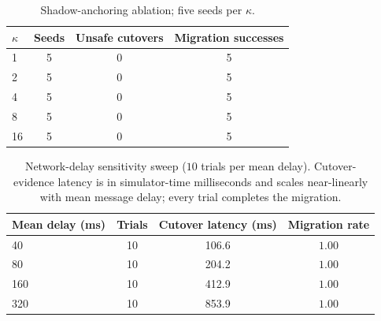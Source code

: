 \documentclass[journal]{IEEEtran}
\begin{document}
\begin{table}[h]
\centering
\caption{Shadow-anchoring ablation; five seeds per $\kappa$.}
\label{tab:appabl}
\setlength{\tabcolsep}{5pt}\renewcommand{\arraystretch}{1.15}\footnotesize
\begin{tabular}{lccc}
\toprule
$\kappa$ & Seeds & Unsafe cutovers & Migration successes \\
\midrule
1  & 5 & 0 & 5 \\
2  & 5 & 0 & 5 \\
4  & 5 & 0 & 5 \\
8  & 5 & 0 & 5 \\
16 & 5 & 0 & 5 \\
\bottomrule
\end{tabular}
\end{table}

\begin{table}[h!]
\centering
\caption{Network-delay sensitivity sweep
($10$ trials per mean delay). Cutover-evidence latency is in simulator-time milliseconds and scales
near-linearly with mean message delay; every trial completes the migration.}
\label{tab:appsens}
\setlength{\tabcolsep}{5pt}\renewcommand{\arraystretch}{1.15}\footnotesize
\begin{tabular}{lccc}
\toprule
Mean delay (ms) & Trials & Cutover latency (ms) & Migration rate \\
\midrule
40  & 10 & 106.6 & $1.00$ \\
80  & 10 & 204.2 & $1.00$ \\
160 & 10 & 412.9 & $1.00$ \\
320 & 10 & 853.9 & $1.00$ \\
\bottomrule
\end{tabular}
\end{table}

\appendices
\end{document}
